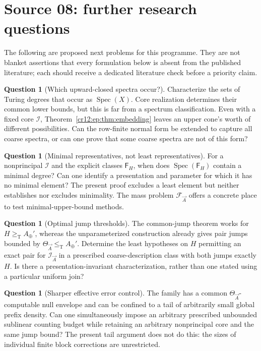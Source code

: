 \documentclass[11pt,letterpaper]{article}
\theoremstyle{plain}
\theoremstyle{definition}
\newtheorem{question}[theorem]{Question}
\theoremstyle{remark}
\numberwithin{equation}{section}
\newcommand{\leT}{\leq_{\mathrm T}}
\newcommand{\geT}{\geq_{\mathrm T}}
\newcommand{\Spec}{\operatorname{Spec}}
\newcommand{\I}{\mathcal I}
\newcommand{\Aplus}{A_{\oplus}}          %
\newcommand{\Fint}{\mathsf F}            %
\newcommand{\FF}{\mathcal F}             %
\begin{document}
\section{Source 08: further research questions}\label{cr12:ep:sec:questions}
The following are proposed next problems for this programme. They are not blanket
assertions that every formulation below is absent from the published literature;
each should receive a dedicated literature check before a priority claim.

\begin{question}[Which upward-closed spectra occur?]\label{cr12:ep:q:spectra}
Characterize the sets of Turing degrees that occur as $\Spec(X)$. Core realization
determines their common lower bounds, but this is far from a spectrum
classification. Even with a fixed core $\I$, Theorem~\ref{cr12:ep:thm:embedding}
leaves an upper cone's worth of different possibilities. Can the row-finite normal
form be extended to capture all coarse spectra, or can one prove that some coarse
spectra are not of this form?
\end{question}

\begin{question}[Minimal representatives, not least representatives]\label{cr12:ep:q:minimal}
For a nonprincipal $\I$ and the explicit classes $\Fint_H$, when does $\Spec(\Fint_H)$
contain a minimal degree? Can one identify a presentation and parameter for which it
has no minimal element? The present proof excludes a least element but neither
establishes nor excludes minimality. The mass problem $\FF_{\vec A}$ offers a concrete
place to test minimal-upper-bound methods.
\end{question}

\begin{question}[Optimal jump thresholds]\label{cr12:ep:q:thresholds}
The common-jump theorem works for $H\geT \Aplus'$, whereas the unparameterized
construction already gives pair jumps bounded by $\Theta_{\vec A}\leT \Aplus'$.
Determine the least hypotheses on $H$ permitting an exact pair for $\I_{\vec A}$ in a
prescribed coarse-description class with both jumps exactly $H$. Is there a
presentation-invariant characterization, rather than one stated using a particular
uniform join?
\end{question}

\begin{question}[Sharper effective error control]\label{cr12:ep:q:budget}
The family has a common $\Theta_{\vec A}$-computable null envelope and can be confined
to a tail of arbitrarily small global prefix density. Can one simultaneously impose
an arbitrary prescribed unbounded sublinear counting budget while retaining an
arbitrary nonprincipal core and the same jump bound? The present tail argument does
not do this: the sizes of individual finite block corrections are unrestricted.
\end{question}
\end{document}
